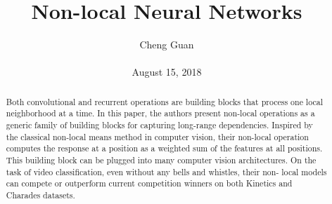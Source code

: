 \documentclass[10pt,twocolumn,letterpaper]{article}
\title{Non-local Neural Networks}
\author{Cheng Guan\\\\
August 15, 2018}
\begin{document}
\maketitle
\begin{abstract}
Both convolutional and recurrent operations are building
blocks that process one local neighborhood at a time. In
this paper, the authors present non-local operations as a generic
family of building blocks for capturing long-range dependencies. Inspired by the classical non-local means method
\cite{buades2005non} in computer vision, their non-local operation computes
the response at a position as a weighted sum of the features
at all positions. This building block can be plugged into
many computer vision architectures. On the task of video
classification, even without any bells and whistles, their non-
local models can compete or outperform current competition
winners on both Kinetics and Charades datasets.	
\end{abstract}
\end{document}
